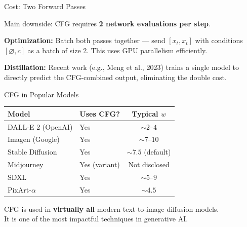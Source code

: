 \documentclass[aspectratio=169, 11pt]{beamer}
\begin{document}
\begin{frame}{Cost: Two Forward Passes}

\alert{Main downside:} CFG requires \textbf{2 network evaluations per step}.

\begin{center}
\end{center}

\bigskip
\textbf{Optimization:} Batch both passes together --- send $[x_t, x_t]$ with conditions $[\varnothing, c]$ as a batch of size 2. This uses GPU parallelism efficiently.

\bigskip
\textbf{Distillation:} Recent work (e.g., Meng et al., 2023) trains a single model to directly predict the CFG-combined output, eliminating the double cost.

\end{frame}

\begin{frame}{CFG in Popular Models}

\begin{center}
\renewcommand{\arraystretch}{1.6}
\begin{tabular}{llc}
\toprule
\textbf{Model} & \textbf{Uses CFG?} & \textbf{Typical $w$} \\
\midrule
DALL-E 2 (OpenAI) & Yes & $\sim 2$--$4$ \\
Imagen (Google) & Yes & $\sim 7$--$10$ \\
Stable Diffusion & Yes & $\sim 7.5$ (default) \\
Midjourney & Yes (variant) & Not disclosed \\
SDXL & Yes & $\sim 5$--$9$ \\
PixArt-$\alpha$ & Yes & $\sim 4.5$ \\
\bottomrule
\end{tabular}
\end{center}

\bigskip
\centering
CFG is used in \textbf{virtually all} modern text-to-image diffusion models.\\
It is one of the most impactful techniques in generative AI.

\end{frame}
\end{document}

